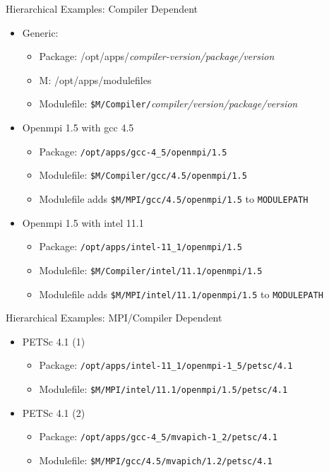 \documentclass{beamer}
\begin{document}
\begin{frame}{Hierarchical Examples: Compiler Dependent}
  \begin{itemize}
    \item Generic:
      \begin{itemize}
        \item Package: /opt/apps/\emph{compiler-version/package/version}
        \item M: {\color{blue}/opt/apps/modulefiles}
        \item Modulefile: \texttt{{\color{blue}\$M}/Compiler/}\emph{compiler/version/package/version}
      \end{itemize}
    \item Openmpi 1.5 with gcc 4.5
      \begin{itemize}
        \item Package: \texttt{/opt/apps/gcc-4\_5/openmpi/1.5}
        \item Modulefile: \texttt{{\color{blue}\$M}/Compiler/gcc/4.5/openmpi/1.5}
        \item Modulefile adds \texttt{{\color{blue}\$M}/MPI/gcc/4.5/openmpi/1.5}
          to \texttt{MODULEPATH} \\
      \end{itemize}          
    \item Openmpi 1.5 with intel 11.1
      \begin{itemize}
        \item Package: \texttt{/opt/apps/intel-11\_1/openmpi/1.5}
        \item Modulefile: \texttt{{\color{blue}\$M}/Compiler/intel/11.1/openmpi/1.5}
        \item Modulefile adds \texttt{\$M/MPI/intel/11.1/openmpi/1.5}
          to \texttt{MODULEPATH}
          
      \end{itemize}
  \end{itemize}
\end{frame}

\begin{frame}{Hierarchical Examples: MPI/Compiler Dependent}
  \begin{itemize}
    \item PETSc 4.1 (1)
      \begin{itemize}
        \item Package: \texttt{/opt/apps/intel-11\_1/openmpi-1\_5/petsc/4.1}
        \item Modulefile: \texttt{{\color{blue}\$M}/MPI/intel/11.1/openmpi/1.5/petsc/4.1}
      \end{itemize}
    \item PETSc 4.1 (2)
      \begin{itemize}
        \item Package: \texttt{/opt/apps/gcc-4\_5/mvapich-1\_2/petsc/4.1}
        \item Modulefile: \texttt{{\color{blue}\$M}/MPI/gcc/4.5/mvapich/1.2/petsc/4.1}
      \end{itemize}
  \end{itemize}
\end{frame}
\end{document}
